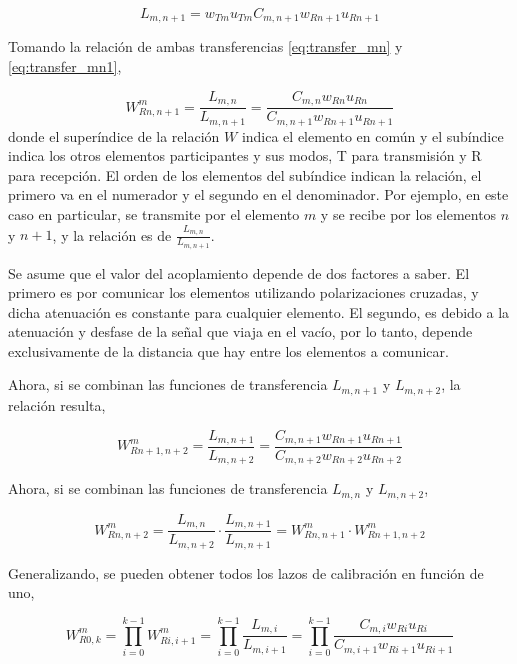 \begin{equation}
	L_{m,n + 1} = w_{Tm} u_{Tm} C_{m,n + 1} w_{Rn + 1} u_{Rn + 1}
	\label{eq:transfer_mn1}
\end{equation}

Tomando la relación de ambas transferencias \ref{eq:transfer_mn} y \ref{eq:transfer_mn1}, 

\begin{equation}
	W^{m}_{Rn,n + 1} = \dfrac{L_{m,n}}{L_{m,n + 1}} = \dfrac{C_{m,n} w_{Rn} u_{Rn}}{C_{m,n + 1} w_{Rn + 1} u_{Rn + 1}}
\end{equation}
donde el superíndice de la relación $W$ indica el elemento en común y el subíndice indica los otros elementos participantes y
sus modos, T para transmisión y R para recepción. El orden de los elementos del subíndice indican la relación, el primero va
en el numerador y el segundo en el denominador. Por ejemplo, en este caso en particular, se transmite por el elemento $m$ y
se recibe por los elementos $n$ y $n+1$, y la relación es de $\frac{L_{m,n}}{L_{m,n + 1}}$.

Se asume que el valor del acoplamiento depende de dos factores a saber. El primero es por comunicar los elementos utilizando
polarizaciones cruzadas, y dicha atenuación es constante para cualquier elemento. El segundo, es debido a la atenuación y
desfase de la señal que viaja en el vacío, por lo tanto, depende exclusivamente de la distancia que hay entre los elementos
a comunicar.

Ahora, si se combinan las funciones de transferencia $L_{m,n+1}$ y $L_{m,n+2}$, la relación resulta,

\begin{equation}
	W^{m}_{Rn + 1,n + 2} = \dfrac{L_{m,n+1}}{L_{m,n+2}} = \dfrac{C_{m,n+1} w_{Rn+1} u_{Rn+1}}{C_{m,n + 2} w_{Rn + 2} u_{Rn + 2}}
\end{equation}

Ahora, si se combinan las funciones de transferencia $L_{m,n}$ y $L_{m,n+2}$,

\begin{equation}
	W^{m}_{Rn,n + 2} = \dfrac{L_{m,n}}{L_{m,n + 2}}\cdot\dfrac{L_{m,n+1}}{L_{m,n+1}} = W^{m}_{Rn,n+1}\cdot W^{m}_{Rn+1,n + 2}
\end{equation}


Generalizando, se pueden obtener todos los lazos de calibración en función de uno,

\begin{equation}
	W^{m}_{R0,k} = \prod_{i=0}^{k-1} W^{m}_{Ri,i+1} = \prod_{i=0}^{k-1}\dfrac{L_{m,i}}{L_{m,i+1}} =
		\prod_{i=0}^{k-1}\dfrac{C_{m,i} w_{Ri} u_{Ri}}{C_{m,i + 1} w_{Ri + 1} u_{Ri + 1}}
	\label{eq:rx_cal}
\end{equation}

